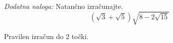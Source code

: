 \documentclass[addpoints]{exam}
\begin{document}
\begin{questions}









      

    \bonusquestion[3]
    \textit{Dodatna naloga:} Natančno izračunajte. $$ \left(\sqrt{3}+\sqrt{5}\right)\sqrt{8-2\sqrt{15}} $$

    \begin{solution}[5cm]
        Pravilen izračun do $2$ točki.
    \end{solution}




\end{questions}
\end{document}
